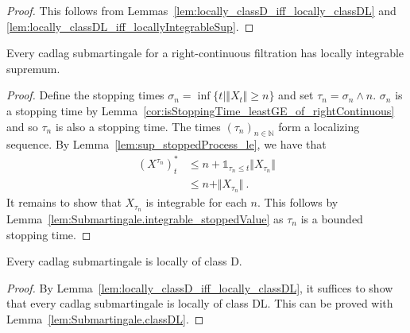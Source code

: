 \begin{proof}
  \leanok
This follows from Lemmas~\ref{lem:locally_classD_iff_locally_classDL} and \ref{lem:locally_classDL_iff_locallyIntegrableSup}.
\end{proof}


\begin{lemma}\label{lem:Submartingale.locallyIntegrableSup}
Every cadlag submartingale for a right-continuous filtration has locally integrable supremum.
\end{lemma}

\begin{proof}
Define the stopping times $\sigma_n = \inf\{t \mid \Vert X_t \Vert \ge n\}$ and set $\tau_n = \sigma_n \wedge n$.
$\sigma_n$ is a stopping time by Lemma~\ref{cor:isStoppingTime_leastGE_of_rightContinuous} and so $\tau_n$ is also a stopping time.
The times $(\tau_n)_{n \in \mathbb{N}}$ form a localizing sequence.
By Lemma~\ref{lem:sup_stoppedProcess_le}, we have that
\begin{align*}
  (X^{\tau_n})^*_t
  & \le n + \mathbb{1}_{\tau_n \le t} \Vert X_{\tau_n} \Vert \\
  & \le n + \Vert X_{\tau_n} \Vert
  \: .
\end{align*}
It remains to show that $X_{\tau_n}$ is integrable for each $n$.
This follows by Lemma~\ref{lem:Submartingale.integrable_stoppedValue} as $\tau_n$ is a bounded stopping time.
\end{proof}



\begin{lemma}\label{lem:Submartingale.locally_classD}
Every cadlag submartingale is locally of class D.
\end{lemma}

\begin{proof}
By Lemma~\ref{lem:locally_classD_iff_locally_classDL}, it suffices to show that every cadlag submartingale is locally of class DL.
This can be proved with Lemma~\ref{lem:Submartingale.classDL}.
\end{proof}


